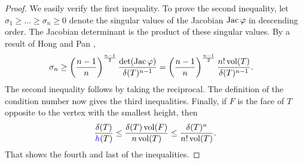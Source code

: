\documentclass[10pt,a4paper]{article}
\begin{document}
\begin{proof}
%     
    We easily verify the first inequality. To prove the second inequality, let $\sigma_1 \geq \dots \geq \sigma_n \geq 0$ denote the singular values of the Jacobian $\operatorname{{\rm Jac}}\varphi$ in descending order.
    The Jacobian determinant is the product of these singular values. 
    By a result of Hong and Pan \cite{hong1992lower},
    \begin{align*}
        \sigma_{n}
        &\geq 
        \left( \frac{n-1}{n} \right)^{\frac{n-1}{2}}
        \frac{ \det(\operatorname{{\rm Jac}}\varphi) }{ {\delta}(T)^{n-1} }
        = 
        \left( \frac{n-1}{n} \right)^{\frac{n-1}{2}}
        \frac{ n! \operatorname{vol}(T) }{ {\delta}(T)^{n-1} }
        .
    \end{align*}
    The second inequality follows by taking the reciprocal. 
    The definition of the condition number now gives the third inequalities. 
    Finally, 
    if $F$ is the face of $T$ opposite to the vertex with the smallest height, then 
    \begin{align*}
        \frac{ \diam(T) }{ \height(T) }
        \leq 
        \frac{ \diam(T) \vol(F) }{ n \vol(T) }
        \leq 
        \frac{ \diam(T)^{n} }{ n! \vol(T) }
        .
    \end{align*}
    That shows the fourth and last of the inequalities. 
\end{proof}
\end{document}
